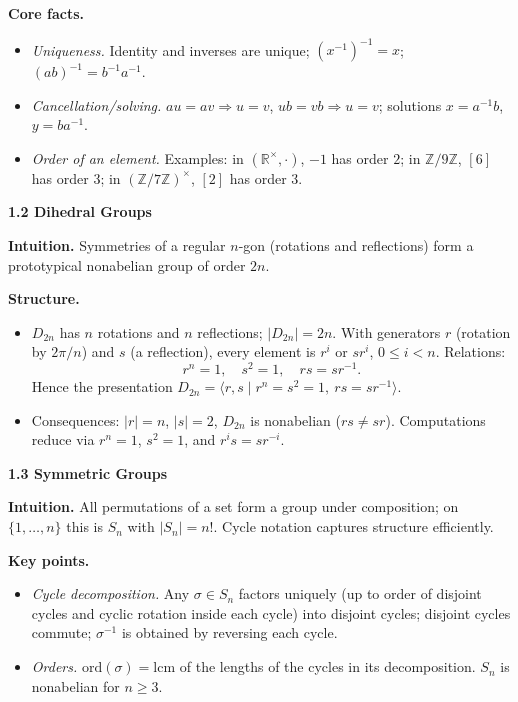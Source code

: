 \documentclass[12pt]{article}
\theoremstyle{definition}
\begin{document}
\textbf{Core facts.}
\begin{itemize}\itemsep3pt
\item \emph{Uniqueness.} Identity and inverses are unique; $(x^{-1})^{-1}=x$; $(ab)^{-1}=b^{-1}a^{-1}$.
\item \emph{Cancellation/solving.} $au=av\Rightarrow u=v$, $ub=vb\Rightarrow u=v$; solutions $x=a^{-1}b$, $y=ba^{-1}$.
\item \emph{Order of an element.} Examples: in $(\mathbb{R}^\times,\cdot)$, $-1$ has order $2$; in $\mathbb{Z}/9\mathbb{Z}$, $[6]$ has order $3$; in $(\mathbb{Z}/7\mathbb{Z})^\times$, $[2]$ has order $3$.
\end{itemize}

\newpage

\textbf{1.2 Dihedral Groups}

\newpage

\textbf{Intuition.} Symmetries of a regular $n$-gon (rotations and reflections) form a prototypical nonabelian group of order $2n$.

\textbf{Structure.}
\begin{itemize}\itemsep3pt
\item $D_{2n}$ has $n$ rotations and $n$ reflections; $|D_{2n}|=2n$. With generators $r$ (rotation by $2\pi/n$) and $s$ (a reflection), every element is $r^i$ or $sr^i$, $0\le i<n$. Relations:
\[
r^n=1,\quad s^2=1,\quad rs=sr^{-1}. 
\]
Hence the presentation $D_{2n}=\langle r,s\mid r^n=s^2=1,\ rs=sr^{-1}\rangle$.
\item Consequences: $|r|=n$, $|s|=2$, $D_{2n}$ is nonabelian ($rs\ne sr$). Computations reduce via $r^n=1$, $s^2=1$, and $r^is=sr^{-i}$.
\end{itemize}

\newpage

\textbf{1.3 Symmetric Groups}

\newpage

\textbf{Intuition.} All permutations of a set form a group under composition; on $\{1,\dots,n\}$ this is $S_n$ with $|S_n|=n!$. Cycle notation captures structure efficiently.

\textbf{Key points.}
\begin{itemize}\itemsep3pt
\item \emph{Cycle decomposition.} Any $\sigma\in S_n$ factors uniquely (up to order of disjoint cycles and cyclic rotation inside each cycle) into disjoint cycles; disjoint cycles commute; $\sigma^{-1}$ is obtained by reversing each cycle.
\item \emph{Orders.} $\mathrm{ord}(\sigma)=\mathrm{lcm}$ of the lengths of the cycles in its decomposition. $S_n$ is nonabelian for $n\ge 3$.
\end{itemize}
\end{document}
